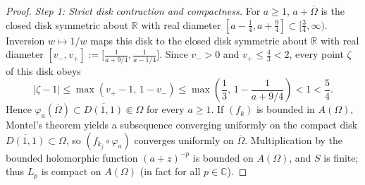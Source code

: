 \documentclass[11pt]{article}
\theoremstyle{definition}
\theoremstyle{remark}
\newcommand{\R}{\mathbb{R}}
\newcommand{\C}{\mathbb{C}}
\begin{document}
\begin{proof}
\emph{Step 1: Strict disk contraction and compactness.}
For $a\ge1$, $a+\overline\Omega$ is the closed disk symmetric about $\R$ with
real diameter $[a-\frac14,a+\frac94]\subset[\frac34,\infty)$. Inversion
$w\mapsto 1/w$ maps this disk to the closed disk symmetric about $\R$ with
real diameter $[v_-,v_+]:=\bigl[\frac{1}{a+9/4},\frac{1}{a-1/4}\bigr]$.
Since $v_->0$ and $v_+\le\frac43<2$, every point $\zeta$ of this disk obeys
\[
|\zeta-1|\le\max(v_+-1,\,1-v_-)\le\max\!\left(\frac13,\,1-\frac{1}{a+9/4}\right)<1<\frac54.
\]
Hence $\varphi_a(\overline\Omega)\subset\overline{D(1,1)}\Subset\Omega$ for
every $a\ge1$. If $(f_k)$ is bounded in $A(\Omega)$, Montel's theorem yields a
subsequence converging uniformly on the compact disk $\overline{D(1,1)}\subset\Omega$,
so $(f_{k_j}\circ\varphi_a)$ converges uniformly on $\overline\Omega$.
Multiplication by the bounded holomorphic function $(a+z)^{-p}$ is bounded on
$A(\Omega)$, and $S$ is finite; thus $L_p$ is compact on $A(\Omega)$ (in fact
for all $p\in\C$).


\end{proof}
\end{document}
